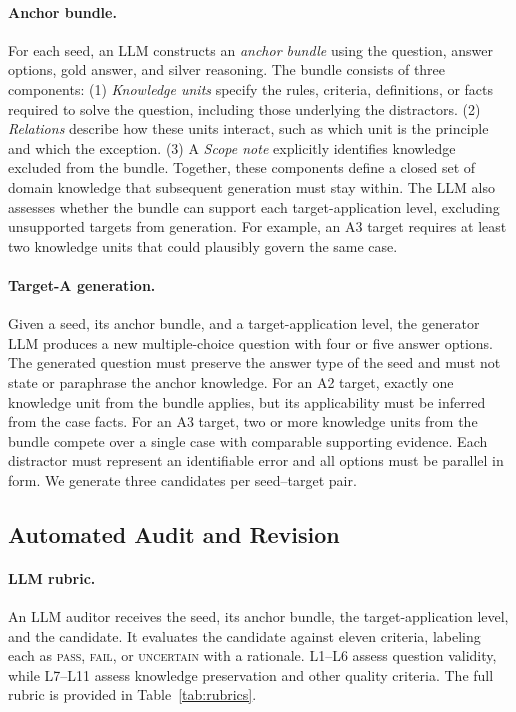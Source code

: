 \paragraph{Anchor bundle.}
For each seed, an LLM constructs an \textit{anchor bundle} using the question, answer options, gold answer, and silver reasoning.
The bundle consists of three components: 
(1) \textit{Knowledge units} specify the rules, criteria, definitions, or facts required to solve the question, including those underlying the distractors.
(2) \textit{Relations} describe how these units interact, such as which unit is the principle and which the exception.
(3) A \textit{Scope note} explicitly identifies knowledge excluded from the bundle.
Together, these components define a closed set of domain knowledge that subsequent generation must stay within.
The LLM also assesses whether the bundle can support each target-application level, excluding unsupported targets from generation.
For example, an A3 target requires at least two knowledge units that could plausibly govern the same case.

\paragraph{Target-A generation.}
Given a seed, its anchor bundle, and a target-application level, the generator LLM  produces a new multiple-choice question with four or five answer options.
The generated question must preserve the answer type of the seed and must not state or paraphrase the anchor knowledge.
For an A2 target, exactly one knowledge unit from the bundle applies, but its applicability must be inferred from the case facts.
For an A3 target, two or more knowledge units from the bundle compete over a single case with comparable supporting evidence.
Each distractor must represent an identifiable error and all options must be parallel in form.
We generate three candidates per seed--target pair.

\subsection{Automated Audit and Revision}
\label{sec:audit}

\paragraph{LLM rubric.}
An LLM auditor receives the seed, its anchor bundle, the target-application level, and the candidate.
It evaluates the candidate against eleven criteria, labeling each as \textsc{pass}, \textsc{fail}, or \textsc{uncertain} with a rationale.
L1--L6 assess question validity, while L7--L11 assess knowledge preservation and other quality criteria.
The full rubric is provided in Table~\ref{tab:rubrics}.

